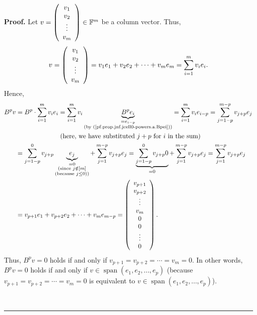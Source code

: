 \documentclass[numbers=enddot,12pt,final,onecolumn,notitlepage]{scrartcl}%
\numberwithin{exer}{subsection}
\theoremstyle{definition}
\newenvironment{proof}[1][Proof]{\noindent\textbf{#1.} }{\ \rule{0.5em}{0.5em}}
\let\sumnonlimits\sum
\renewcommand{\sum}{\sumnonlimits\limits}
\begin{document}
\begin{proof}
Let $v=\left(
\begin{array}
[c]{c}%
v_{1}\\
v_{2}\\
\vdots\\
v_{m}%
\end{array}
\right)  \in\mathbb{F}^{m}$ be a column vector. Thus,
\[
v=\left(
\begin{array}
[c]{c}%
v_{1}\\
v_{2}\\
\vdots\\
v_{m}%
\end{array}
\right)  =v_{1}e_{1}+v_{2}e_{2}+\cdots+v_{m}e_{m}=\sum_{i=1}^{m}v_{i}e_{i}.
\]
Hence,%
\begin{align*}
B^{p}v  &  =B^{p}\cdot\sum_{i=1}^{m}v_{i}e_{i}=\sum_{i=1}^{m}v_{i}%
\underbrace{B^{p}e_{i}}_{\substack{=e_{i-p}\\\text{(by
(\ref{pf.prop.jnf.jcell0-powers.a.Bpei}))}}}=\sum_{i=1}^{m}v_{i}e_{i-p}%
=\sum_{j=1-p}^{m-p}v_{j+p}e_{j}\\
&  \ \ \ \ \ \ \ \ \ \ \ \ \ \ \ \ \ \ \ \ \left(  \text{here, we have
substituted }j+p\text{ for }i\text{ in the sum}\right) \\
&  =\sum_{j=1-p}^{0}v_{j+p}\underbrace{e_{j}}_{\substack{=0\\\text{(since
}j\notin\left[  m\right]  \\\text{(because }j\leq0\text{))}}}+\sum_{j=1}%
^{m-p}v_{j+p}e_{j}=\underbrace{\sum_{j=1-p}^{0}v_{j+p}0}_{=0}+\sum_{j=1}%
^{m-p}v_{j+p}e_{j}=\sum_{j=1}^{m-p}v_{j+p}e_{j}\\
&  =v_{p+1}e_{1}+v_{p+2}e_{2}+\cdots+v_{m}e_{m-p}=\left(
\begin{array}
[c]{c}%
v_{p+1}\\
v_{p+2}\\
\vdots\\
v_{m}\\
0\\
0\\
\vdots\\
0
\end{array}
\right)  .
\end{align*}
Thus, $B^{p}v=0$ holds if and only if $v_{p+1}=v_{p+2}=\cdots=v_{m}=0$. In
other words, $B^{p}v=0$ holds if and only if $v\in\operatorname*{span}\left(
e_{1},e_{2},\ldots,e_{p}\right)  $ (because $v_{p+1}=v_{p+2}=\cdots=v_{m}=0$
is equivalent to $v\in\operatorname*{span}\left(  e_{1},e_{2},\ldots
,e_{p}\right)  $).


\end{proof}
\end{document}
